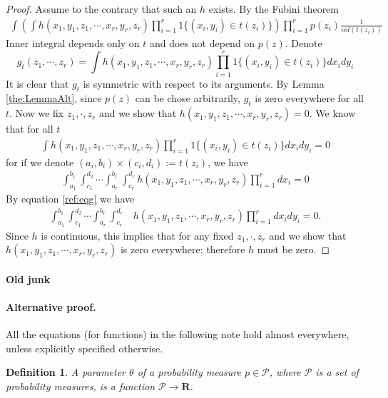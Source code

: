 \documentclass{article}
\newtheorem{definition}{Definition}
\begin{document}
\begin{proof}
Assume to the contrary that such an $h$ exists. By the Fubini theorem  
\begin{align}
\int  \left( \int h(x_1,y_1,z_1,\cdots, x_r,y_r,z_r) \prod_{i=1}^r 1\{ (x_i,y_i) \in t(z_i) \}   \right) \prod_{i=1}^r  p(z_i) \frac{1}{vol(t(z_i))}
\end{align}
Inner integral depends only on $t$ and does not depend on $p(z)$. Denote 
\[
g_{t}( z_1,\cdots,z_r)  = \int h(x_1,y_1,z_1,\cdots, x_r,y_r,z_r) \prod_{i=1}^r 1\{ (x_i,y_i) \in t(z_i) \} dx_i dy_i 
\]
It is clear that  $g_{t}$ is symmetric with respect to its arguments. By Lemma \ref{the:LemmaAlt}, since $p(z)$ can be chose arbitrarily, $g_{t}$ is zero everywhere for all $t$. Now we fix $z_1, \cdot , z_r$ and we show that  $h(x_1,y_1,z_1, \cdots, x_r,y_r,z_r) =0$. We know that for all $t$
\begin{align}
\int h(x_1,y_1,z_1,\cdots, x_r,y_r,z_r) \prod_{i=1}^r 1\{ (x_i,y_i) \in t(z_i) \} dx_i dy_i  =  0
\end{align}
for if we denote $(a_i,b_i) \times (c_i,d_i):= t(z_i)$, we have  
\begin{align}
\int_{a_1}^{b_1} \int_{c_1}^{d_2} \cdots \int_{a_r}^{b_r} \int_{c_r}^{d_r} h(x_1,y_1,z_1, \cdots, x_r,y_r,z_r) \prod_{i=1}^{r}  dx_i = 0 
\end{align}
 By equation \ref{ref:eqg} we have 
\begin{align}
 \int_{a_1}^{b_1} \int_{c_1}^{d_2} \cdots \int_{a_r}^{b_r} \int_{c_r}^{d_r}& h(x_1,y_1,z_1, \cdots, x_r,y_r,z_r) \prod_{i=1}^{r}  dx_i dy_i = 0.
\end{align}
Since $h$ is continuous, this implies that for any fixed  $z_1, \cdot , z_r$ and we show that  $h(x_1,y_1,z_1, \cdots, x_r,y_r,z_r)$ is zero everywhere; therefore $h$ must be zero. 
\end{proof}
















\paragraph{Old junk}

\paragraph{Alternative proof.}
All the equations (for functions) in the following note  hold almost everywhere, unless explicitly specified otherwise.
\begin{definition}
 A parameter  $\theta$ of a probability measure $p \in \mathcal P$, where $\mathcal P$ is a set of probability measures, is a function $\mathcal P  \to  \mathbf R$.   
\end{definition}
\end{document}
